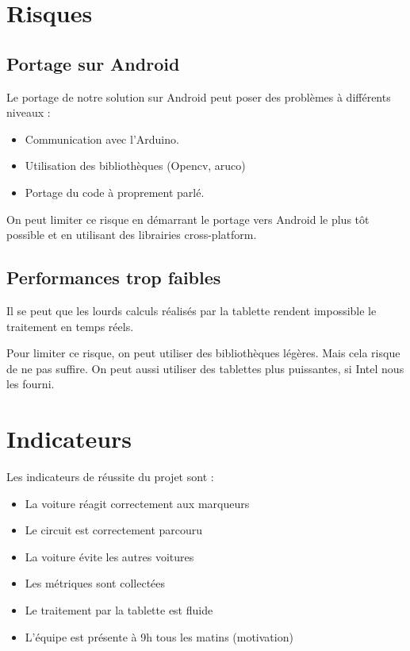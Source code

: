 \documentclass[a4paper,12pt]{article}
\begin{document}
\section{Risques}

\subsection{Portage sur Android}

Le portage de notre solution sur Android peut poser des problèmes à différents
niveaux :
\begin{itemize}
    \item Communication avec l'Arduino.
    \item Utilisation des bibliothèques (Opencv, aruco)
    \item Portage du code à proprement parlé.
\end{itemize}

On peut limiter ce risque en démarrant le portage vers Android le plus tôt
possible et en utilisant des librairies cross-platform.

\subsection{Performances trop faibles}

Il se peut que les lourds calculs réalisés par la tablette rendent impossible
le traitement en temps réels.

Pour limiter ce risque, on peut utiliser des bibliothèques légères. Mais cela
risque de ne pas suffire.
On peut aussi utiliser des tablettes plus puissantes, si Intel nous les fourni.


\section{Indicateurs}

Les indicateurs de réussite du projet sont :
\begin{itemize}
    \item La voiture réagit correctement aux marqueurs
    \item Le circuit est correctement parcouru
    \item La voiture évite les autres voitures
    \item Les métriques sont collectées
    \item Le traitement par la tablette est fluide
    \item L'équipe est présente à 9h tous les matins (motivation)
\end{itemize}
\end{document}
